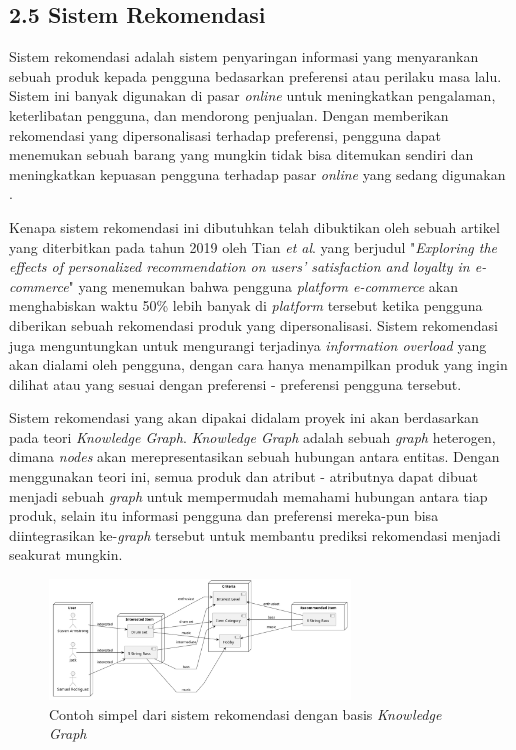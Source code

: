 \documentclass[a4paper]{article}
\begin{document}
\subsection*{2.5 Sistem Rekomendasi}

Sistem rekomendasi adalah sistem penyaringan informasi yang menyarankan sebuah produk kepada pengguna bedasarkan preferensi atau perilaku masa lalu. Sistem ini banyak digunakan di pasar \textit{online} untuk meningkatkan pengalaman, keterlibatan pengguna, dan mendorong penjualan. Dengan memberikan rekomendasi yang dipersonalisasi terhadap preferensi, pengguna dapat menemukan sebuah barang yang mungkin tidak bisa ditemukan sendiri dan meningkatkan kepuasan pengguna terhadap pasar \textit{online} yang sedang digunakan \autocite{adiwardana2019}.

Kenapa sistem rekomendasi ini dibutuhkan telah dibuktikan oleh sebuah artikel yang diterbitkan pada tahun 2019 oleh Tian \textit{et al}. yang berjudul "\textit{Exploring the effects of personalized recommendation on users' satisfaction and loyalty in e-commerce}" yang menemukan bahwa pengguna \textit{platform e-commerce}  akan menghabiskan waktu 50\% lebih banyak di \textit{platform} tersebut ketika pengguna diberikan sebuah rekomendasi produk yang dipersonalisasi\autocite{tian2019exploring}. Sistem rekomendasi juga menguntungkan untuk mengurangi terjadinya \textit{information overload} yang akan dialami oleh pengguna, dengan cara hanya menampilkan produk yang ingin dilihat atau yang sesuai dengan preferensi - preferensi pengguna tersebut\autocite{karimi2018news}.

Sistem rekomendasi yang akan dipakai didalam proyek ini akan berdasarkan pada teori \textit{Knowledge Graph}. \textit{Knowledge Graph} adalah sebuah \textit{graph} heterogen, dimana \textit{nodes} akan merepresentasikan sebuah hubungan antara entitas\autocite{guo2020survey}. Dengan menggunakan teori ini, semua produk dan atribut - atributnya dapat dibuat menjadi sebuah \textit{graph} untuk mempermudah memahami hubungan antara tiap produk, selain itu informasi pengguna dan preferensi mereka-pun bisa diintegrasikan ke-\textit{graph} tersebut untuk membantu prediksi rekomendasi menjadi seakurat mungkin.

\begin{figure}[h]
    \centering
    \includegraphics[width=8cm]{recommendation system architecture.png}
    \caption{Contoh simpel dari sistem rekomendasi dengan basis \textit{Knowledge Graph}}
\end{figure}
\end{document}
